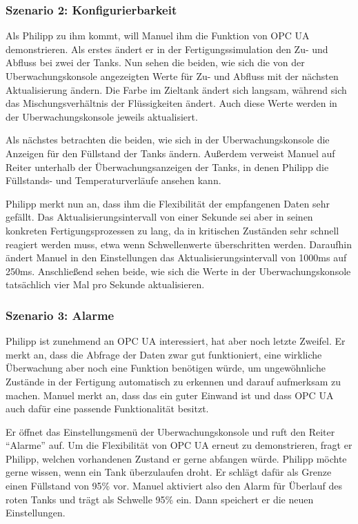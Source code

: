 \documentclass[parskip=full]{scrartcl}
\begin{document}
\subsubsection{Szenario 2: Konfigurierbarkeit}
Als Philipp zu ihm kommt, will Manuel ihm die Funktion von \gls{OPC UA} demonstrieren.
Als erstes ändert er in der \gls{Fertigungssimulation} den Zu- und Abfluss bei zwei der Tanks. Nun sehen die beiden, wie
sich die von der \gls{Uberwachungskonsole} angezeigten Werte für Zu- und Abfluss mit der nächsten Aktualisierung ändern. Die
Farbe im Zieltank ändert sich langsam, während sich das Mischungsverhältnis der Flüssigkeiten ändert. Auch diese
Werte werden in der \gls{Uberwachungskonsole} jeweils aktualisiert.

Als nächstes betrachten die beiden, wie sich in der \gls{Uberwachungskonsole} die Anzeigen für den Füllstand der Tanks ändern.
Außerdem verweist Manuel auf Reiter unterhalb der Überwachungsanzeigen der Tanks,
in denen Philipp die Füllstands- und Temperaturverläufe ansehen kann.

Philipp merkt nun an, dass ihm die Flexibilität der empfangenen Daten sehr gefällt. Das Aktualisierungsintervall von
einer Sekunde sei aber in seinen konkreten Fertigungsprozessen zu lang, da in kritischen Zuständen sehr schnell
reagiert werden muss, etwa wenn Schwellenwerte überschritten werden. Daraufhin ändert Manuel in den
Einstellungen das Aktualisierungsintervall von 1000ms auf 250ms. Anschließend sehen beide, wie sich die Werte in der
\gls{Uberwachungskonsole} tatsächlich vier Mal pro Sekunde aktualisieren.

\subsubsection{Szenario 3: Alarme}
Philipp ist zunehmend an \gls{OPC UA} interessiert, hat aber noch letzte Zweifel. Er merkt an, dass die Abfrage der Daten
zwar gut funktioniert, eine wirkliche \"Uberwachung aber noch eine Funktion ben\"otigen w\"urde,
um ungew\"ohnliche Zust\"ande in der Fertigung automatisch zu erkennen und darauf aufmerksam zu machen.
Manuel merkt an, dass das ein guter Einwand ist und dass \gls{OPC UA} auch daf\"ur eine passende Funktionalit\"at besitzt.

Er \"offnet das Einstellungsmen\"u der \gls{Uberwachungskonsole} und ruft den Reiter "`Alarme"' auf. Um die Flexibilit\"at
von \gls{OPC UA} erneut zu demonstrieren, fragt er Philipp, welchen vorhandenen Zustand er gerne abfangen w\"urde. Philipp möchte gerne
wissen, wenn ein Tank \"uberzulaufen droht. Er schl\"agt daf\"ur als Grenze einen F\"ullstand von 95\% vor.
Manuel aktiviert also den Alarm für Überlauf des roten Tanks und trägt als Schwelle 95\% ein.
Dann speichert er die neuen Einstellungen.
\end{document}

